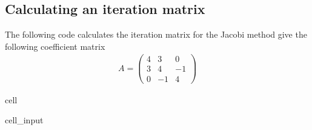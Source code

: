 \documentclass[letterpaper,10pt,english]{jupyterBook}
\begin{document}
\subsection{Calculating an iteration matrix}
\label{\detokenize{8_Appendices/8.1_Python:calculating-an-iteration-matrix}}
\sphinxAtStartPar
The following code calculates the iteration matrix for the Jacobi method give the following coefficient matrix
\begin{align*}
    A = \begin{pmatrix} 
        4 & 3 & 0 \\
        3 & 4 & -1 \\
        0 & -1 & 4
    \end{pmatrix}
\end{align*}
\begin{sphinxuseclass}{cell}\begin{sphinxVerbatimInput}

\begin{sphinxuseclass}{cell_input}
\begin{sphinxVerbatim}[commandchars=\\\{\}]
  \PYG{p}{[}\PYG{p}{[}  \PYG{p}{]} \PYG{p}{[}  \PYG{p}{]} \PYG{p}{[}  \PYG{p}{]}\PYG{p}{]}

   
   
      

      
\end{sphinxVerbatim}

\end{sphinxuseclass}\end{sphinxVerbatimInput}
\begin{sphinxVerbatimOutput}


\end{sphinxVerbatimOutput}
\end{sphinxuseclass}
\end{document}
